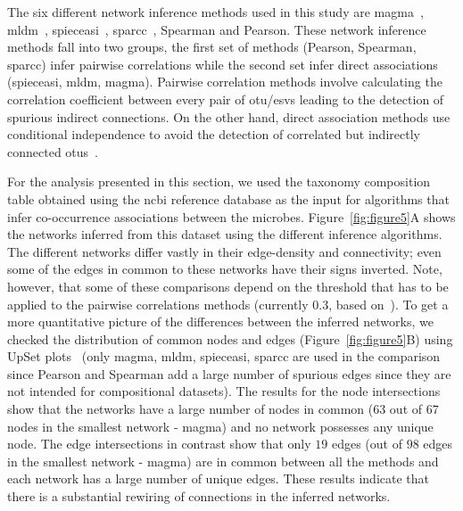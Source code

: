   The six different network inference methods used in this study are \ac{magma}~\cite{Cougoul2019}, \ac{mldm}~\cite{Yang2017}, \ac{spieceasi}~\cite{Kurtz2015}, \ac{sparcc}~\cite{Friedman2012}, Spearman and Pearson.
  These network inference methods fall into two groups, the first set of methods (Pearson, Spearman, \ac{sparcc}) infer pairwise correlations while the second set infer direct associations (\ac{spieceasi}, \ac{mldm}, \ac{magma}).
  Pairwise correlation methods involve calculating the correlation coefficient between every pair of \ac{otu}/\ac{esv}s leading to the detection of spurious indirect connections.
  On the other hand, direct association methods use conditional independence to avoid the detection of correlated but indirectly connected \ac{otu}s~\cite{Kurtz2015,Menon2018}.

  For the analysis presented in this section, we used the taxonomy composition table obtained using the \ac{ncbi} reference database as the input for algorithms that infer co-occurrence associations between the microbes.
  Figure~\ref{fig:figure5}A shows the networks inferred from this dataset using the different inference algorithms.
  The different networks differ vastly in their edge-density and connectivity; even some of the edges in common to these networks have their signs inverted. Note, however, that some of these comparisons depend on the threshold that has to be applied to the pairwise correlations methods (currently 0.3, based on~\cite{Friedman2012}).
  To get a more quantitative picture of the differences between the inferred networks, we checked the distribution of common nodes and edges (Figure~\ref{fig:figure5}B) using UpSet plots~\cite{Lex} (only \ac{magma}, \ac{mldm}, \ac{spieceasi}, \ac{sparcc} are used in the comparison since Pearson and Spearman add a large number of spurious edges since they are not intended for compositional datasets).
  The results for the node intersections show that the networks have a large number of nodes in common ($63$ out of $67$ nodes in the smallest network - \ac{magma}) and no network possesses any unique node.
  The edge intersections in contrast show that only $19$ edges (out of $98$ edges in the smallest network - \ac{magma}) are in common between all the methods and each network has a large number of unique edges.
  These results indicate that there is a substantial rewiring of connections in the inferred networks.

